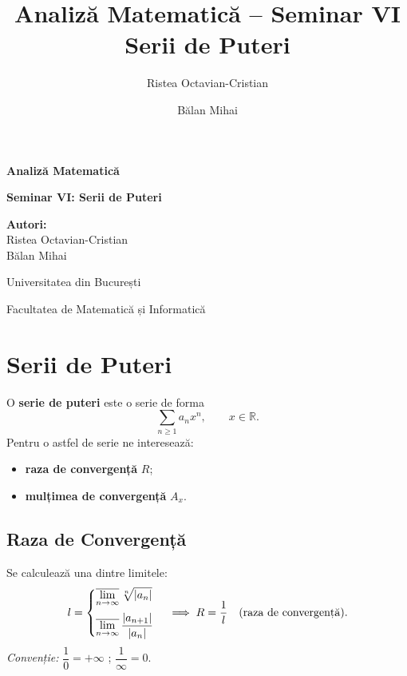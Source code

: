 \documentclass[12pt, a4paper]{report}
\title{Analiză Matematică -- Seminar VI\\ Serii de Puteri}
\author{Ristea Octavian-Cristian \and Bălan Mihai}
\DeclarePairedDelimiter\abs{\lvert}{\rvert}
\begin{document}
	
	\begin{titlepage}
		\centering
		\vspace*{2cm}
		{\Huge \bfseries Analiză Matematică \par}
		\vspace{1cm}
		{\Large \bfseries Seminar VI: Serii de Puteri \par}
		\vspace{0.5cm}
		\vfill
		{\Large \textbf{Autori:} \\ Ristea Octavian-Cristian \\ Bălan Mihai \par}
		\vspace{1.5cm}
		{\large Universitatea din București \par}
		{\large Facultatea de Matematică și Informatică \par}
		\vspace{2cm}
	\end{titlepage}
	
	
	\cleardoublepage
	\tableofcontents
	\cleardoublepage
	
	\pagestyle{main}
	
	\chapter{Serii de Puteri}
	
	O \textbf{serie de puteri} este o serie de forma
	\[
	\sum_{n \ge 1} a_n x^n, \qquad x \in \mathbb{R}.
	\]
	Pentru o astfel de serie ne interesează:
	\begin{itemize}
		\item \textbf{raza de convergență} $R$;
		\item \textbf{mulțimea de convergență} $A_x$.
	\end{itemize}
	
	\section{Raza de Convergență}
	
	Se calculează una dintre limitele:
	\[
	l =
	\begin{cases}
		\displaystyle \overline{\lim_{n \to \infty}} \, \sqrt[n]{\abs{a_n}} \\[3mm]
		\displaystyle \overline{\lim_{n \to \infty}} \, \frac{\abs{a_{n+1}}}{\abs{a_n}}
	\end{cases}
	\implies R = \frac{1}{l} \quad \text{(raza de convergență).}
	\]
	\textit{Convenție:} $\dfrac{1}{0} = +\infty$ \; ; \; $\dfrac{1}{\infty} = 0$.
	
\end{document}
